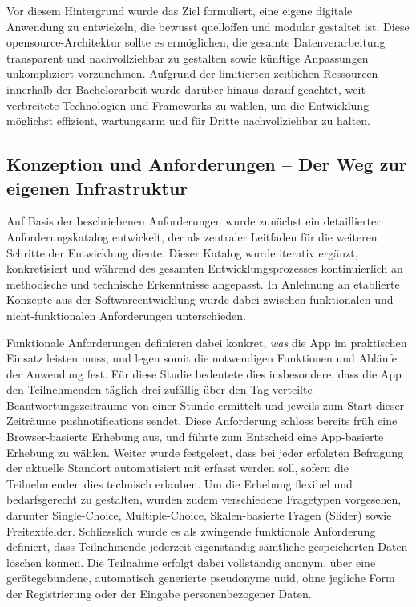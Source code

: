 Vor diesem Hintergrund wurde das Ziel formuliert, eine eigene digitale Anwendung zu entwickeln, die bewusst quelloffen und modular gestaltet ist. Diese \gls{opensource}-Architektur sollte es ermöglichen, die gesamte Datenverarbeitung transparent und nachvollziehbar zu gestalten sowie künftige Anpassungen unkompliziert vorzunehmen. Aufgrund der limitierten zeitlichen Ressourcen innerhalb der Bachelorarbeit wurde darüber hinaus darauf geachtet, weit verbreitete Technologien und Frameworks zu wählen, um die Entwicklung möglichst effizient, wartungsarm und für Dritte nachvollziehbar zu halten.

\subsection{Konzeption und Anforderungen -- Der Weg zur eigenen Infrastruktur}
Auf Basis der beschriebenen Anforderungen wurde zunächst ein detaillierter Anforderungskatalog entwickelt, der als zentraler Leitfaden für die weiteren Schritte der Entwicklung diente. Dieser Katalog wurde iterativ ergänzt, konkretisiert und während des gesamten Entwicklungsprozesses kontinuierlich an methodische und technische Erkenntnisse angepasst. In Anlehnung an etablierte Konzepte aus der Softwareentwicklung wurde dabei zwischen funktionalen und nicht-funktionalen Anforderungen unterschieden.

Funktionale Anforderungen definieren dabei konkret, \textit{was} die App im praktischen Einsatz leisten muss, und legen somit die notwendigen Funktionen und Abläufe der Anwendung fest. Für diese Studie bedeutete dies insbesondere, dass die App den Teilnehmenden täglich drei zufällig über den Tag verteilte Beantwortungszeiträume von einer Stunde ermittelt und jeweils zum Start dieser Zeiträume \glspl{pushnotification} sendet. Diese Anforderung schloss bereits früh eine Browser-basierte Erhebung aus, und führte zum Entscheid eine App-basierte Erhebung zu wählen. Weiter wurde festgelegt, dass bei jeder erfolgten Befragung der aktuelle Standort automatisiert mit erfasst werden soll, sofern die Teilnehmenden dies technisch erlauben. Um die Erhebung flexibel und bedarfsgerecht zu gestalten, wurden zudem verschiedene Fragetypen vorgesehen, darunter Single-Choice, Multiple-Choice, Skalen-basierte Fragen (Slider) sowie Freitextfelder. Schliesslich wurde es als zwingende funktionale Anforderung definiert, dass Teilnehmende jederzeit eigenständig sämtliche gespeicherten Daten löschen können. Die Teilnahme erfolgt dabei vollständig anonym, über eine gerätegebundene, automatisch generierte pseudonyme \gls{uuid}, ohne jegliche Form der Registrierung oder der Eingabe personenbezogener Daten.
 
